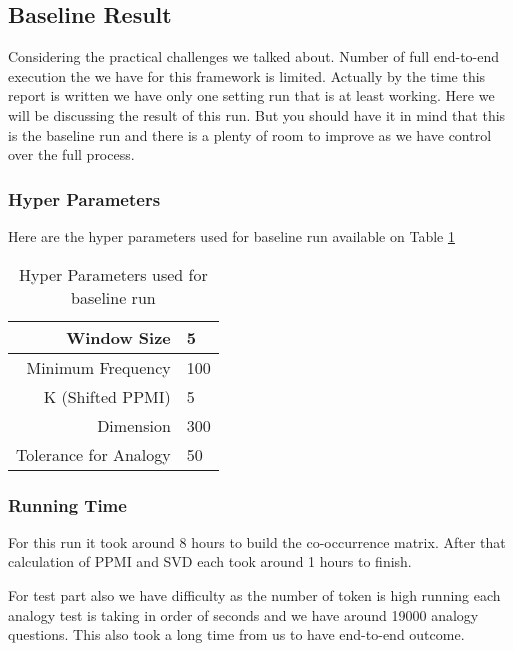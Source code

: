 \subsection{Baseline Result}
Considering the practical challenges we talked about. Number of  full end-to-end execution the we have for this framework is limited. Actually by the time this report is written we have only one setting run that is at least working.  Here we will be discussing the result of this run. But you should have it in mind that this is the baseline run and there is a plenty of room to improve as we have control over the full process. 

\subsubsection{Hyper Parameters}

Here are the hyper parameters used for baseline run  available on Table \ref{table:hyper-baseline}

\begin{table}
    \centering
    \caption{Hyper Parameters used for baseline run}
    \label{table:hyper-baseline}
    \begin{tabular}{|r|l|}
        \hline
            Window Size & 5 \\ 
            \hline
            Minimum Frequency & 100 \\ 
            \hline
            K (Shifted PPMI) & 5 \\ 
            \hline
            Dimension & 300 \\
            \hline
            Tolerance for Analogy & 50 \\
        \hline
    \end{tabular}
\end{table}

\subsubsection{Running Time}
For this run it took around 8 hours to build the co-occurrence matrix. After that calculation of PPMI and SVD each took around 1 hours to finish. 

For test part also we have difficulty as the number of token is high running each analogy test is taking in order of seconds and we have around 19000 analogy questions. This also took a long time from us to have end-to-end outcome. 

